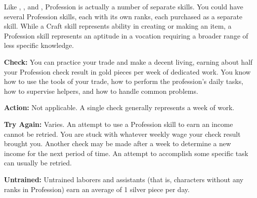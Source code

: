 Like , , and , Profession is actually a number of separate skills. You could have several Profession skills, each with its own ranks, each purchased as a separate skill. While a Craft skill represents ability in creating or making an item, a Profession skill represents an aptitude in a vocation requiring a broader range of less specific knowledge.

\textbf{Check:} You can practice your trade and make a decent living, earning about half your Profession check result in gold pieces per week of dedicated work. You know how to use the tools of your trade, how to perform the profession's daily tasks, how to supervise helpers, and how to handle common problems.

\textbf{Action:} Not applicable. A single check generally represents a week of work.

\textbf{Try Again:} Varies. An attempt to use a Profession skill to earn an income cannot be retried. You are stuck with whatever weekly wage your check result brought you. Another check may be made after a week to determine a new income for the next period of time. An attempt to accomplish some specific task can usually be retried.

\textbf{Untrained:} Untrained laborers and assistants (that is, characters without any ranks in Profession) earn an average of 1 silver piece per day.